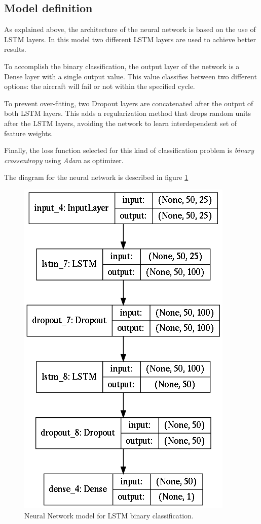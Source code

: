 
\subsection{Model definition}

As explained above, the architecture of the neural network is based on the use of LSTM layers. In this model two different LSTM layers are used to achieve better results.

To accomplish the binary classification, the output layer of the network is a Dense layer with a single output value. This value classifies between two different options: the aircraft will fail or not within the specified cycle.

To prevent over-fitting, two Dropout layers are concatenated after the output of both LSTM layers. This adds a regularization method that drops random units after the LSTM layers, avoiding the network to learn interdependent set of feature weights.

Finally, the loss function selected for this kind of classification problem is \textit{binary crossentropy} using \textit{Adam} as optimizer.

The diagram for the neural network is described in figure \ref{fig:binary-lstm-model}

\begin{figure}[H]
\centering
\includegraphics[scale=0.5]{Figures/binary-lstm-model}
\decoRule
\caption[Neural Network model for LSTM binary classification]{Neural Network model for LSTM binary classification.}
\label{fig:binary-lstm-model}
\end{figure}

